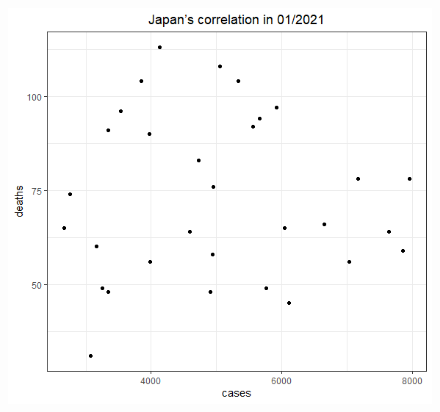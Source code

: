 \documentclass[english,10pt,table]{beamer}
\begin{document}
{\begin{figure}[H]
\begin{center}
        \includegraphics[scale = 0.2]{ix/ix.2/JPN_01_2021.png}
        

\end{center}
\end{figure}}
\end{document}
